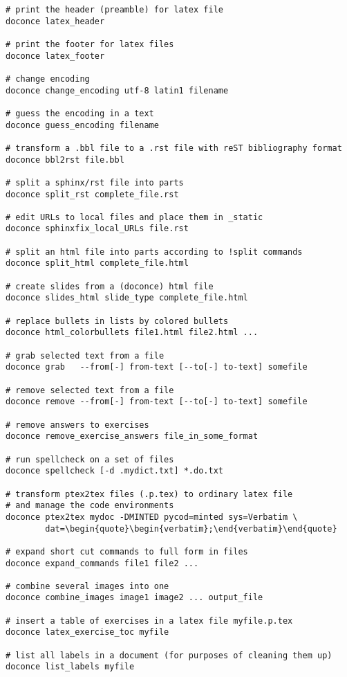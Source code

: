 \documentclass[twoside]{article}
\begin{document}
\begin{Verbatim}
# print the header (preamble) for latex file
doconce latex_header

# print the footer for latex files
doconce latex_footer

# change encoding
doconce change_encoding utf-8 latin1 filename

# guess the encoding in a text
doconce guess_encoding filename

# transform a .bbl file to a .rst file with reST bibliography format
doconce bbl2rst file.bbl

# split a sphinx/rst file into parts
doconce split_rst complete_file.rst

# edit URLs to local files and place them in _static
doconce sphinxfix_local_URLs file.rst

# split an html file into parts according to !split commands
doconce split_html complete_file.html

# create slides from a (doconce) html file
doconce slides_html slide_type complete_file.html

# replace bullets in lists by colored bullets
doconce html_colorbullets file1.html file2.html ...

# grab selected text from a file
doconce grab   --from[-] from-text [--to[-] to-text] somefile

# remove selected text from a file
doconce remove --from[-] from-text [--to[-] to-text] somefile

# remove answers to exercises
doconce remove_exercise_answers file_in_some_format

# run spellcheck on a set of files
doconce spellcheck [-d .mydict.txt] *.do.txt

# transform ptex2tex files (.p.tex) to ordinary latex file
# and manage the code environments
doconce ptex2tex mydoc -DMINTED pycod=minted sys=Verbatim \
        dat=\begin{quote}\begin{verbatim};\end{verbatim}\end{quote}

# expand short cut commands to full form in files
doconce expand_commands file1 file2 ...

# combine several images into one
doconce combine_images image1 image2 ... output_file

# insert a table of exercises in a latex file myfile.p.tex
doconce latex_exercise_toc myfile

# list all labels in a document (for purposes of cleaning them up)
doconce list_labels myfile
\end{Verbatim}
\end{document}
